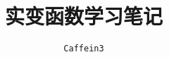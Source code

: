 \documentclass[b5paper]{ctexrep}
\begin{document}
\title{实变函数学习笔记}
\author{\texttt{Caffein3}}
\date{}
\maketitle
\tableofcontents
% 
% 
% 

\end{document}
